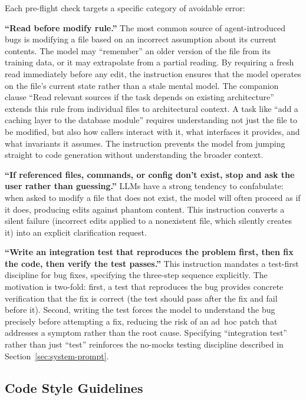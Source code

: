 \documentclass{article}
\begin{document}
Each pre-flight check targets a specific category of avoidable error:

\textbf{``Read before modify rule.''}  The most common source of agent-introduced bugs is modifying a file based on an incorrect assumption about its current contents.  The model may ``remember'' an older version of the file from its training data, or it may extrapolate from a partial reading.  By requiring a fresh read immediately before any edit, the instruction ensures that the model operates on the file's current state rather than a stale mental model.  The companion clause ``Read relevant sources if the task depends on existing architecture'' extends this rule from individual files to architectural context.  A task like ``add a caching layer to the database module'' requires understanding not just the file to be modified, but also how callers interact with it, what interfaces it provides, and what invariants it assumes.  The instruction prevents the model from jumping straight to code generation without understanding the broader context.

\textbf{``If referenced files, commands, or config don't exist, stop and ask the user rather than guessing.''}  LLMs have a strong tendency to confabulate: when asked to modify a file that does not exist, the model will often proceed as if it does, producing edits against phantom content.  This instruction converts a silent failure (incorrect edits applied to a nonexistent file, which silently creates it) into an explicit clarification request.

\textbf{``Write an integration test that reproduces the problem first, then fix the code, then verify the test passes.''}  This instruction mandates a test-first discipline for bug fixes, specifying the three-step sequence explicitly.  The motivation is two-fold: first, a test that reproduces the bug provides concrete verification that the fix is correct (the test should pass after the fix and fail before it).  Second, writing the test forces the model to understand the bug precisely before attempting a fix, reducing the risk of an ad~hoc patch that addresses a symptom rather than the root cause.  Specifying ``integration test'' rather than just ``test'' reinforces the no-mocks testing discipline described in Section~\ref{sec:system-prompt}.

\subsection{Code Style Guidelines}
\end{document}
